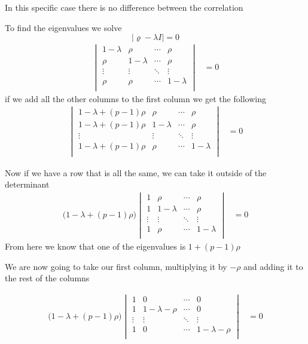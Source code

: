 In this specific case there is no difference between the correlation 

To find the eigenvalues
we solve
\[|\varrho - \lambda I| = 0\]
\begin{align*}
    \begin{vmatrix}
    1-\lambda & \rho & \cdots & \rho \\
    \rho & 1-\lambda & \cdots & \rho \\
    \vdots & \vdots & \ddots & \vdots \\
    \rho & \rho & \cdots & 1-\lambda \\
    \end{vmatrix} &= 0
\end{align*}
if we add all the other columns to the first column we get the following
\begin{align*}
    \begin{vmatrix}
    1-\lambda + (p-1)\rho & \rho & \cdots & \rho \\
    1-\lambda + (p-1)\rho & 1-\lambda & \cdots & \rho \\
    \vdots & \vdots & \ddots & \vdots \\
    1-\lambda + (p-1)\rho & \rho & \cdots & 1-\lambda \\
    \end{vmatrix} & = 0
\end{align*}

Now if we have a row that is all the same, we can take it outside of the determinant
\begin{align*}
    \Big(1-\lambda + (p-1)\rho \Big)
    \begin{vmatrix}
    1 & \rho & \cdots & \rho \\
    1& 1-\lambda & \cdots & \rho \\
    \vdots & \vdots & \ddots & \vdots \\
    1 & \rho & \cdots & 1-\lambda \\
    \end{vmatrix} & = 0
\end{align*}
From here we know that one of the eigenvalues is $1+(p-1)\rho$


We are now going to take our first column, multiplying it by $-\rho$ and adding it to the rest of the columns

\begin{align*}
    \Big(1-\lambda + (p-1)\rho \Big)
    \begin{vmatrix}
    1 & 0 & \cdots & 0\\
    1& 1-\lambda - \rho & \cdots & 0 \\
    \vdots & \vdots & \ddots & \vdots \\
    1 & 0 & \cdots & 1-\lambda - \rho \\
    \end{vmatrix} & = 0
\end{align*}

